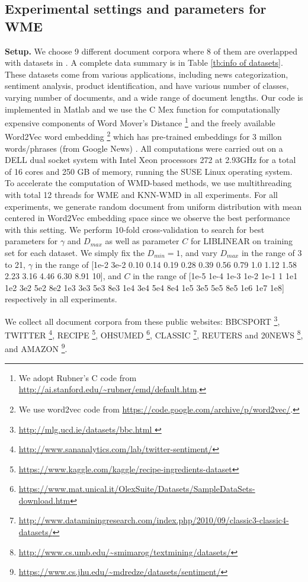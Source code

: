 \documentclass[11pt,a4paper]{article}
\newcommand{\1}{\boldsymbol{1}}
\begin{document}
\subsection{Experimental settings and parameters for WME}
\label{App:Experimental settings and parameters for WME}

\textbf{Setup.} We choose 9 different document corpora where 8 of them are overlapped with datasets in \cite{kusner2015word,huang2016supervised}. A complete data summary is in Table \ref{tb:info of datasets}. These datasets come from various applications, including news categorization, sentiment analysis, product identification, and have various number of classes, varying number of documents, and a wide range of document lengths.
Our code is implemented in Matlab and we use the C Mex function for computationally expensive components of Word Mover's Distance \footnote{We adopt Rubner's C code from \url{http://ai.stanford.edu/~rubner/emd/default.htm}. } \cite{rubner2000earth} and the freely available Word2Vec word embedding \footnote{We use word2vec code from \url{https://code.google.com/archive/p/word2vec/}. } which has pre-trained embeddings for 3 millon words/phrases (from Google News) \cite{mikolov2013efficient}. 
All computations were carried out on a DELL dual socket system with Intel Xeon processors 272 at 2.93GHz for a total of 16 cores and 250 GB of memory, running the SUSE Linux operating system. To accelerate the computation of WMD-based methods, we use multithreading with total 12 threads for WME and KNN-WMD in all experiments.
For all experiments, we generate random document from uniform distribution with mean centered in Word2Vec embedding space since we observe the best performance with this setting. We perform 10-fold cross-validation to search for best parameters for $\gamma$ and $D_{max}$ as well as parameter $C$ for LIBLINEAR on training set for each dataset. We simply fix the $D_{min}=1$, and vary $D_{max}$ in the range of 3 to 21, $\gamma$ in the range of [1e-2 3e-2 0.10 0.14 0.19 0.28 0.39 0.56 0.79 1.0 1.12 1.58 2.23 3.16 4.46 6.30 8.91 10], and $C$ in the range of [1e-5 1e-4 1e-3 1e-2 1e-1 1 1e1 1e2 3e2 5e2 8e2 1e3 3e3 5e3 8e3 1e4 3e4 5e4 8e4 1e5 3e5 5e5 8e5 1e6 1e7 1e8] respectively in all experiments. 

We collect all document corpora from these public websites:
BBCSPORT \footnote{\url{http://mlg.ucd.ie/datasets/bbc.html }}, 
TWITTER \footnote{\url{http://www.sananalytics.com/lab/twitter-sentiment/}}, 
RECIPE \footnote{\url{https://www.kaggle.com/kaggle/recipe-ingredients-dataset}},
OHSUMED \footnote{\url{https://www.mat.unical.it/OlexSuite/Datasets/SampleDataSets-download.htm}},
CLASSIC \footnote{\url{http://www.dataminingresearch.com/index.php/2010/09/classic3-classic4-datasets/}},
REUTERS and 20NEWS \footnote{\url{http://www.cs.umb.edu/~smimarog/textmining/datasets/}},
and AMAZON \footnote{\url{https://www.cs.jhu.edu/~mdredze/datasets/sentiment/}}.
\end{document}

